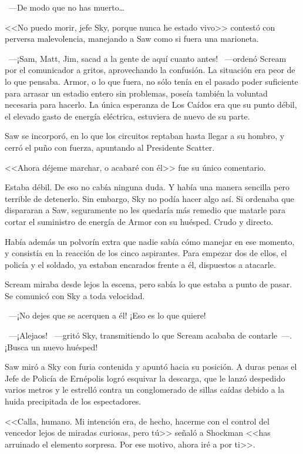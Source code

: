 ~---De modo que no has muerto\dots

<<No puedo morir, jefe Sky, porque nunca he estado vivo>> contestó con perversa malevolencia, manejando a Saw como si fuera una marioneta.

~---¡Sam, Matt, Jim, sacad a la gente de aquí cuanto antes! ~---ordenó Scream por el comunicador a gritos, aprovechando la confusión. La situación era peor de lo que pensaba. Armor, o lo que fuera, no sólo tenía en el pasado poder suficiente para arrasar un estadio entero sin problemas, poseía también la voluntad necesaria para hacerlo. La única esperanza de Los Caídos era que su punto débil, el elevado gasto de energía eléctrica, estuviera de nuevo de su parte.

Saw se incorporó, en lo que los circuitos reptaban hasta llegar a su hombro, y cerró el puño con fuerza, apuntando al Presidente Scatter.

<<Ahora déjeme marchar, o acabaré con él>> fue su único comentario.

Estaba débil. De eso no cabía ninguna duda. Y había una manera sencilla pero terrible de detenerlo. Sin embargo, Sky no podía hacer algo así. Si ordenaba que dispararan a Saw, seguramente no les quedaría más remedio que matarle para cortar el suministro de energía de Armor con su huésped. Crudo y directo.

Había además un polvorín extra que nadie sabía cómo manejar en ese momento, y consistía en la reacción de los cinco aspirantes. Para empezar dos de ellos, el policía y el soldado, ya estaban encarados frente a él, dispuestos a atacarle.

Scream miraba desde lejos la escena, pero sabía lo que estaba a punto de pasar. Se comunicó con Sky a toda velocidad.

~---¡No dejes que se acerquen a él! ¡Eso es lo que quiere!

~---¡Alejaos! ~---gritó Sky, transmitiendo lo que Scream acababa de contarle~---. ¡Busca un nuevo huésped!

Saw miró a Sky con furia contenida y apuntó hacia su posición. A duras penas el Jefe de Policía de Ernépolis logró esquivar la descarga, que le lanzó despedido varios metros y le estrelló contra un conglomerado de sillas caídas debido a la huida precipitada de los espectadores.

<<Calla, humano. Mi intención era, de hecho, hacerme con el control del vencedor lejos de miradas curiosas, pero tú>> señaló a Shockman <<has arruinado el elemento sorpresa. Por ese motivo, ahora iré a por ti>>.


